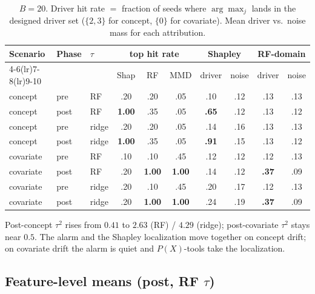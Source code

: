 \documentclass[11pt]{article}
\begin{document}
\begin{table}[ht]
\centering
\caption{$B{=}20$. Driver hit rate $=$ fraction of seeds where
$\arg\max_j$ lands in the designed driver set
($\{2,3\}$ for concept, $\{0\}$ for covariate).
Mean driver vs.\ noise mass for each attribution.}
\label{tab:window}
\scriptsize
\begin{tabular}{ll l ccc cc cc}
\toprule
Scenario & Phase & $\tau$
& \multicolumn{3}{c}{top hit rate}
& \multicolumn{2}{c}{Shapley}
& \multicolumn{2}{c}{RF-domain} \\
\cmidrule(lr){4-6}\cmidrule(lr){7-8}\cmidrule(lr){9-10}
& & & Shap & RF & MMD & driver & noise & driver & noise \\
\midrule
concept & pre  & RF    & .20 & .20 & .05 & .10 & .12 & .13 & .13 \\
concept & post & RF    & \textbf{1.00} & .35 & .05 & \textbf{.65} & .12 & .13 & .12 \\
concept & pre  & ridge & .20 & .20 & .05 & .14 & .16 & .13 & .13 \\
concept & post & ridge & \textbf{1.00} & .35 & .05 & \textbf{.91} & .15 & .13 & .12 \\
\midrule
covariate & pre  & RF    & .10 & .10 & .45 & .12 & .12 & .12 & .13 \\
covariate & post & RF    & .20 & \textbf{1.00} & \textbf{1.00} & .14 & .12 & \textbf{.37} & .09 \\
covariate & pre  & ridge & .20 & .10 & .45 & .20 & .17 & .12 & .13 \\
covariate & post & ridge & .20 & \textbf{1.00} & \textbf{1.00} & .24 & .19 & \textbf{.37} & .09 \\
\bottomrule
\end{tabular}
\end{table}

Post-concept $\tau^2$ rises from $0.41$ to $2.63$ (RF) / $4.29$ (ridge);
post-covariate $\tau^2$ stays near $0.5$. The alarm and the Shapley
localization move together on concept drift; on covariate drift the
alarm is quiet and $P(X)$-tools take the localization.

\subsection{Feature-level means (post, RF $\tau$)}
\end{document}
